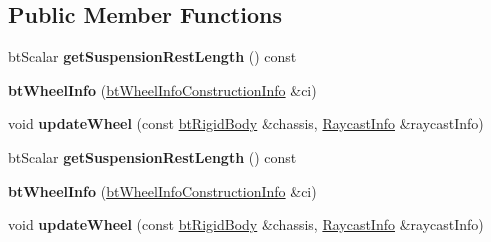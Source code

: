 \subsection*{Public Member Functions}
\begin{DoxyCompactItemize}
\item 
\mbox{\label{structbtWheelInfo_a64c4160c12675ed8ac9cdbdb53fa5f55}} 
bt\+Scalar {\bfseries get\+Suspension\+Rest\+Length} () const
\item 
\mbox{\label{structbtWheelInfo_ac3fdf40cfa2b5a8c8d7d11c545486c31}} 
{\bfseries bt\+Wheel\+Info} (\hyperlink{structbtWheelInfoConstructionInfo}{bt\+Wheel\+Info\+Construction\+Info} \&ci)
\item 
\mbox{\label{structbtWheelInfo_a3eee5f0febe5dae578bc91994d064e7b}} 
void {\bfseries update\+Wheel} (const \hyperlink{classbtRigidBody}{bt\+Rigid\+Body} \&chassis, \hyperlink{structbtWheelInfo_1_1RaycastInfo}{Raycast\+Info} \&raycast\+Info)
\item 
\mbox{\label{structbtWheelInfo_a64c4160c12675ed8ac9cdbdb53fa5f55}} 
bt\+Scalar {\bfseries get\+Suspension\+Rest\+Length} () const
\item 
\mbox{\label{structbtWheelInfo_ac3fdf40cfa2b5a8c8d7d11c545486c31}} 
{\bfseries bt\+Wheel\+Info} (\hyperlink{structbtWheelInfoConstructionInfo}{bt\+Wheel\+Info\+Construction\+Info} \&ci)
\item 
\mbox{\label{structbtWheelInfo_a3eee5f0febe5dae578bc91994d064e7b}} 
void {\bfseries update\+Wheel} (const \hyperlink{classbtRigidBody}{bt\+Rigid\+Body} \&chassis, \hyperlink{structbtWheelInfo_1_1RaycastInfo}{Raycast\+Info} \&raycast\+Info)
\end{DoxyCompactItemize}

